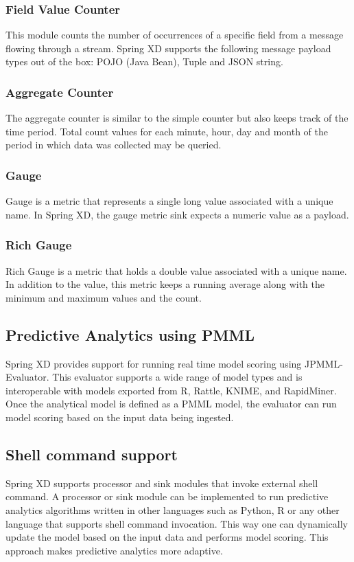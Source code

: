 \subsubsection {Field Value Counter}

This module counts the number of occurrences of a specific field from a message
flowing through a stream. Spring XD supports the following message payload types
out of the box: POJO (Java Bean), Tuple and JSON string.

\subsubsection {Aggregate Counter}

The aggregate counter is similar to the simple counter but also keeps track of
the time period. Total count values for each minute, hour, day and month
of the period in which data was collected may be queried.

\subsubsection {Gauge}
Gauge is a metric that represents a single long value associated with a unique name.
In Spring XD, the gauge metric sink expects a numeric value as a payload.

\subsubsection {Rich Gauge}
Rich Gauge is a metric that holds a double value associated with a unique name. In
addition to the value, this metric keeps a running average along with the minimum and
maximum values and the count.

\subsection {Predictive Analytics using PMML}
Spring XD provides support for running real time model scoring using JPMML-Evaluator.
This evaluator supports a wide range of model types and is interoperable with
models exported from R, Rattle, KNIME, and RapidMiner. Once the analytical model
is defined as a PMML model, the evaluator can run model scoring based on the 
input data being ingested.

\subsection {Shell command support}
Spring XD supports processor and sink modules that invoke external shell command.
A processor or sink module can be implemented to run predictive
analytics algorithms written in other languages such as Python, R or any other language that
supports shell command invocation. This way one can dynamically update the model based on the
input data and performs model scoring. This approach makes predictive analytics more adaptive.

